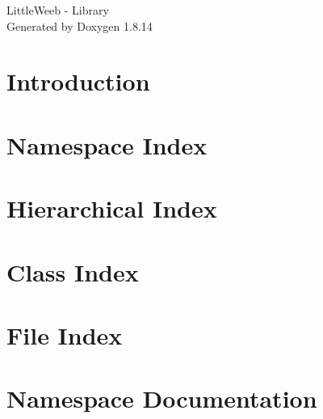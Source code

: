 \documentclass[twoside]{book}
\newcommand{\+}{\discretionary{\mbox{\scriptsize$\hookleftarrow$}}{}{}}
\newcommand{\clearemptydoublepage}{%
  \newpage{\pagestyle{empty}\cleardoublepage}%
}
\begin{document}
\hypersetup{pageanchor=false,
             bookmarksnumbered=true,
             pdfencoding=unicode
            }
\begin{titlepage}
\vspace*{7cm}
\begin{center}%
{\Large Little\+Weeb -\/ Library }\\
\vspace*{1cm}
{\large Generated by Doxygen 1.8.14}\\
\end{center}
\end{titlepage}
\clearemptydoublepage
{}
\tableofcontents
\clearemptydoublepage
{}
\hypersetup{pageanchor=true}

\chapter{Introduction}
\label{md__r_e_a_d_m_e}

\chapter{Namespace Index}

\chapter{Hierarchical Index}

\chapter{Class Index}

\chapter{File Index}

\chapter{Namespace Documentation}











\end{document}
